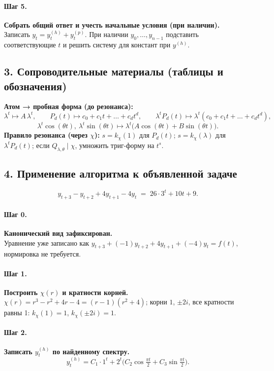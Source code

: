 \paragraph{Шаг 5.} \textbf{Собрать общий ответ и учесть начальные условия (при наличии).}\\
Записать \(y_t=y^{(h)}_t+y^{(p)}_t\). При наличии \(y_0,\dots,y_{n-1}\) подставить соответствующие \(t\) и решить систему для констант при \(y^{(h)}\).

\subsection*{3. Сопроводительные материалы (таблицы и обозначения)}

\textbf{Атом → пробная форма (до резонанса):}
\[
\lambda^{t}\mapsto A\,\lambda^{t},\qquad
P_d(t)\mapsto c_0 + c_1 t + \dots + c_d t^d,\qquad
\lambda^{t}P_d(t)\mapsto \lambda^{t}(c_0 + c_1 t + \dots + c_d t^d),
\]
\[
\lambda^{t}\cos(\theta t),\ \lambda^{t}\sin(\theta t)\mapsto \lambda^{t}\big(A\cos(\theta t)+B\sin(\theta t)\big).
\]
\textbf{Правило резонанса (через \(\chi\)):} \(s=k_\chi(1)\) для \(P_d(t)\); \(s=k_\chi(\lambda)\) для \(\lambda^{t}P_d(t)\); если \(Q_{\lambda,\theta}\mid\chi\), умножить триг-форму на \(t^{s}\).

\subsection*{4. Применение алгоритма к объявленной задаче}

\[
y_{t+3}-y_{t+2}+4y_{t+1}-4y_{t} \;=\; 26\cdot 3^{t} + 10t + 9.
\]

\paragraph{Шаг 0.} \textbf{Канонический вид зафиксирован.}\\
Уравнение уже записано как \(y_{t+3}+(-1)y_{t+2}+4y_{t+1}+(-4)y_t=f(t)\), нормировка не требуется.

\paragraph{Шаг 1.} \textbf{Построить \(\chi(r)\) и кратности корней.}\\
\(\chi(r)=r^3-r^2+4r-4=(r-1)(r^2+4)\); корни \(1\), \(\pm 2i\), все кратности равны 1: \(k_\chi(1)=1\), \(k_\chi(\pm 2i)=1\).

\paragraph{Шаг 2.} \textbf{Записать \(y^{(h)}_t\) по найденному спектру.}\\
\[
y^{(h)}_t=C_1\cdot 1^{t}+2^{t}\Big(C_2\cos\tfrac{\pi t}{2}+C_3\sin\tfrac{\pi t}{2}\Big).
\]


